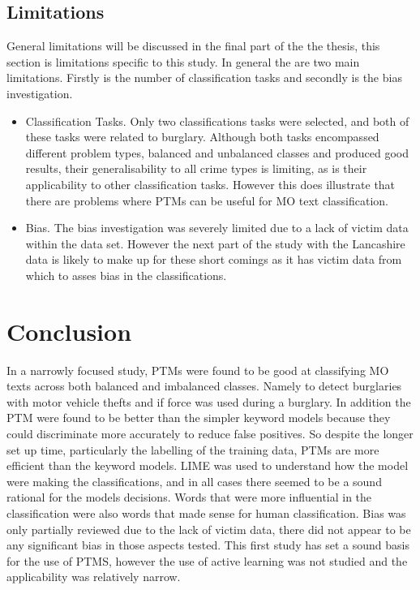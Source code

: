 \subsection{Limitations} General limitations will be discussed in the final part of the the thesis, this section is limitations specific to this study. In general the are two main limitations. Firstly is the number of classification tasks and secondly is the bias investigation.

\begin{itemize}
    \item Classification Tasks. Only two classifications tasks were selected, and both of these tasks were related to burglary. Although both tasks encompassed different problem types, balanced and unbalanced classes and produced good results, their generalisability to all crime types is limiting, as is their applicability to other classification tasks. However this does illustrate that there are problems where PTMs can be useful for MO text classification.
    
    \item Bias. The bias investigation was severely limited due to a lack of victim data within the data set. However the next part of the study with the Lancashire data is likely to make up for these short comings as it has victim data from which to asses bias in the classifications. 
    
\end{itemize}

\section{Conclusion} In a narrowly focused study, PTMs were found to be good at classifying MO texts across both balanced and imbalanced classes. Namely to detect burglaries with motor vehicle thefts and if force was used during a burglary. In addition the PTM were found to be better than the simpler keyword models because they could discriminate more accurately to reduce false positives. So despite the longer set up time, particularly the labelling of the training data, PTMs are more efficient than the keyword models. LIME was used to understand how the model were making the classifications, and in all cases there seemed to be a sound rational for the models decisions. Words that were more influential in the classification were also words that made sense for human classification. Bias was only partially reviewed due to the lack of victim data, there did not appear to be any significant bias in those aspects tested. This first study has set a sound basis for the use of PTMS, however the use of active learning was not studied and the applicability was relatively narrow.


